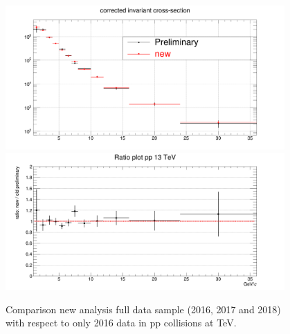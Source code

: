 \begin{figure}[htbp]
\begin{center}
\includegraphics[width=0.95\textwidth]{figures/Dstar/pp13TeV/comparison_plt_dstar2.png}
\includegraphics[width=0.95\textwidth]{figures/Dstar/pp13TeV/comparison_prel_vs_new_pp13TeV.png}
\caption{Comparison new analysis full data sample (2016, 2017 and 2018) with respect to only 2016 data in pp collisions at  TeV.} 
\label{fig:DmesonCorrYieldsCompar}
\end{center}
\end{figure}


